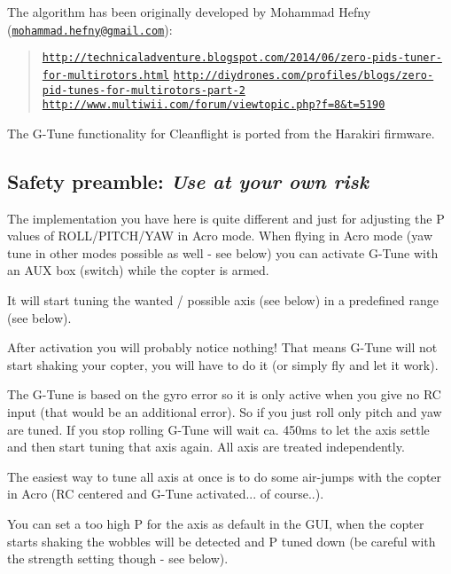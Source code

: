 The algorithm has been originally developed by Mohammad Hefny (\href{mailto:mohammad.hefny@gmail.com}{\tt mohammad.\+hefny@gmail.\+com})\+:

\begin{quote}
\href{http://technicaladventure.blogspot.com/2014/06/zero-pids-tuner-for-multirotors.html}{\tt http\+://technicaladventure.\+blogspot.\+com/2014/06/zero-\/pids-\/tuner-\/for-\/multirotors.\+html} \href{http://diydrones.com/profiles/blogs/zero-pid-tunes-for-multirotors-part-2}{\tt http\+://diydrones.\+com/profiles/blogs/zero-\/pid-\/tunes-\/for-\/multirotors-\/part-\/2} \href{http://www.multiwii.com/forum/viewtopic.php?f=8&t=5190}{\tt http\+://www.\+multiwii.\+com/forum/viewtopic.\+php?f=8\&t=5190} \end{quote}


The G-\/\+Tune functionality for Cleanflight is ported from the Harakiri firmware.

\subsection*{Safety preamble\+: {\itshape Use at your own risk}}

The implementation you have here is quite different and just for adjusting the P values of R\+O\+L\+L/\+P\+I\+T\+C\+H/\+Y\+A\+W in Acro mode. When flying in Acro mode (yaw tune in other modes possible as well -\/ see below) you can activate G-\/\+Tune with an A\+U\+X box (switch) while the copter is armed.

It will start tuning the wanted / possible axis (see below) in a predefined range (see below).

After activation you will probably notice nothing! That means G-\/\+Tune will not start shaking your copter, you will have to do it (or simply fly and let it work).

The G-\/\+Tune is based on the gyro error so it is only active when you give no R\+C input (that would be an additional error). So if you just roll only pitch and yaw are tuned. If you stop rolling G-\/\+Tune will wait ca. 450ms to let the axis settle and then start tuning that axis again. All axis are treated independently.

The easiest way to tune all axis at once is to do some air-\/jumps with the copter in Acro (R\+C centered and G-\/\+Tune activated... of course..).

You can set a too high P for the axis as default in the G\+U\+I, when the copter starts shaking the wobbles will be detected and P tuned down (be careful with the strength setting though -\/ see below).

